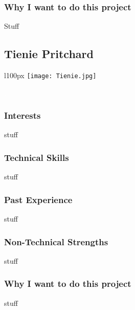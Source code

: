 \subsubsection{Why I want to do this project}
Stuff

\pagebreak
\subsection{Tienie Pritchard}
\begin{wrapfigure}[7]{l}{100px}
\vspace{10pt}
\texttt{[image: Tienie.jpg]}
\end{wrapfigure}

\textcolor{white}{.}
\subsubsection{Interests} stuff
\subsubsection{Technical Skills} stuff
\subsubsection{Past Experience} stuff
\subsubsection{Non-Technical Strengths} stuff
\subsubsection{Why I want to do this project} stuff

